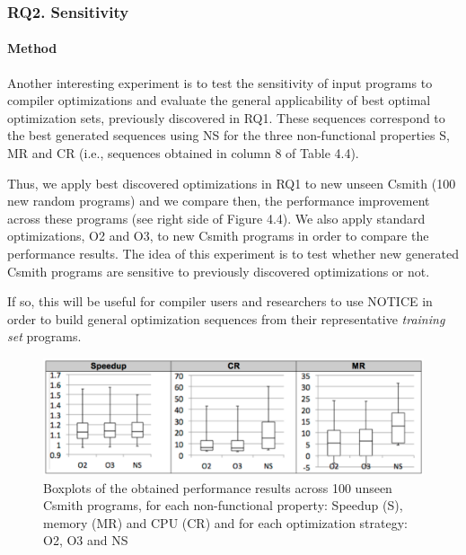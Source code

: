 \noindent{}


\subsubsection{RQ2. Sensitivity}
\paragraph{Method}
Another interesting experiment is to test the sensitivity of input programs to compiler optimizations and evaluate the general applicability of best optimal optimization sets, previously discovered in RQ1. These sequences correspond to the best generated sequences using NS for the three non-functional properties S, MR and CR (i.e., sequences obtained in column 8 of Table 4.4). 

Thus, we apply best discovered optimizations in RQ1 to new unseen Csmith (100 new random programs) and we compare then, the performance improvement across these programs (see right side of Figure 4.4). We also apply standard optimizations, O2 and O3, to new Csmith programs in order to compare the performance results.
The idea of this experiment is to test whether new generated Csmith programs are sensitive to previously discovered optimizations or not. 

If so, this will be useful for compiler users and researchers to use NOTICE in order to build general optimization sequences from their representative \textit{training set} programs.

\begin{figure}[h]
	\centering
	\includegraphics[width=1.\linewidth]{chapitre3/fig/box.pdf}
	\caption{Boxplots of the obtained performance results across 100 unseen Csmith programs, for each non-functional property: Speedup (S), memory (MR) and CPU (CR) and for each optimization strategy: O2, O3 and NS}
\end{figure}

